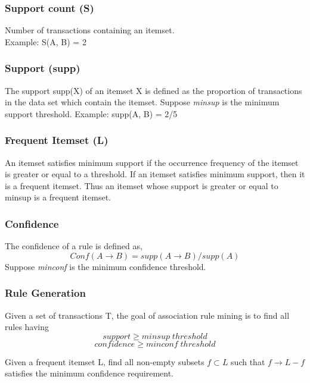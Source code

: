 \subsubsection{Support count (S)}
Number of transactions containing an itemset. \\
Example: S({A, B}) = 2

\subsubsection{Support (supp)}
The support supp(X) of an itemset X is defined as the proportion of transactions in the data set which contain the itemset.
Suppose \textit{minsup} is the minimum support threshold.
Example: supp({A, B}) = 2/5

\subsubsection{Frequent Itemset (L)}
An itemset satisfies minimum support if the occurrence frequency of the itemset
is greater or equal to a threshold. If an itemset satisfies minimum support, then it is a frequent itemset.
Thus an itemset whose support is greater or equal to minsup is a frequent itemset.

\subsubsection{Confidence}
The confidence of a rule is defined as,\\
\begin{equation}
Conf(A \rightarrow B) = supp(A \rightarrow  B) / supp(A)
\end{equation}
Suppose \textit{minconf} is the minimum confidence threshold.

\subsubsection{Rule Generation}
Given a set of transactions T, the goal of association rule mining is to find all rules having\\
\begin{equation}
support \geq minsup \; threshold
\end{equation}
\begin{equation}
confidence \geq minconf \; threshold
\end{equation}

Given a frequent itemset L, find all non-empty subsets $f \subset L$ such that $f \rightarrow  L - f$ satisfies the minimum confidence requirement.

